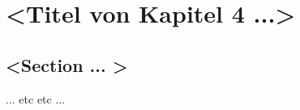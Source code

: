 \setcounter{equation}{0}

\clearpage


\chapter{<Titel von Kapitel 4 ...>}


\section{<Section ... >}

... etc etc ...
